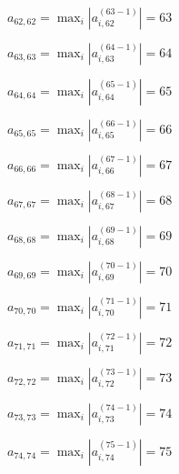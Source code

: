 \documentclass[a4paper,12pt]{article}
\begin{document}
$a _{ 62, 62 } =  \max _i |a _{ i, 62 } ^{ (63 - 1) } | = 63$

$a _{ 63, 63 } =  \max _i |a _{ i, 63 } ^{ (64 - 1) } | = 64$

$a _{ 64, 64 } =  \max _i |a _{ i, 64 } ^{ (65 - 1) } | = 65$

$a _{ 65, 65 } =  \max _i |a _{ i, 65 } ^{ (66 - 1) } | = 66$

$a _{ 66, 66 } =  \max _i |a _{ i, 66 } ^{ (67 - 1) } | = 67$

$a _{ 67, 67 } =  \max _i |a _{ i, 67 } ^{ (68 - 1) } | = 68$

$a _{ 68, 68 } =  \max _i |a _{ i, 68 } ^{ (69 - 1) } | = 69$

$a _{ 69, 69 } =  \max _i |a _{ i, 69 } ^{ (70 - 1) } | = 70$

$a _{ 70, 70 } =  \max _i |a _{ i, 70 } ^{ (71 - 1) } | = 71$

$a _{ 71, 71 } =  \max _i |a _{ i, 71 } ^{ (72 - 1) } | = 72$

$a _{ 72, 72 } =  \max _i |a _{ i, 72 } ^{ (73 - 1) } | = 73$

$a _{ 73, 73 } =  \max _i |a _{ i, 73 } ^{ (74 - 1) } | = 74$

$a _{ 74, 74 } =  \max _i |a _{ i, 74 } ^{ (75 - 1) } | = 75$
\end{document}
